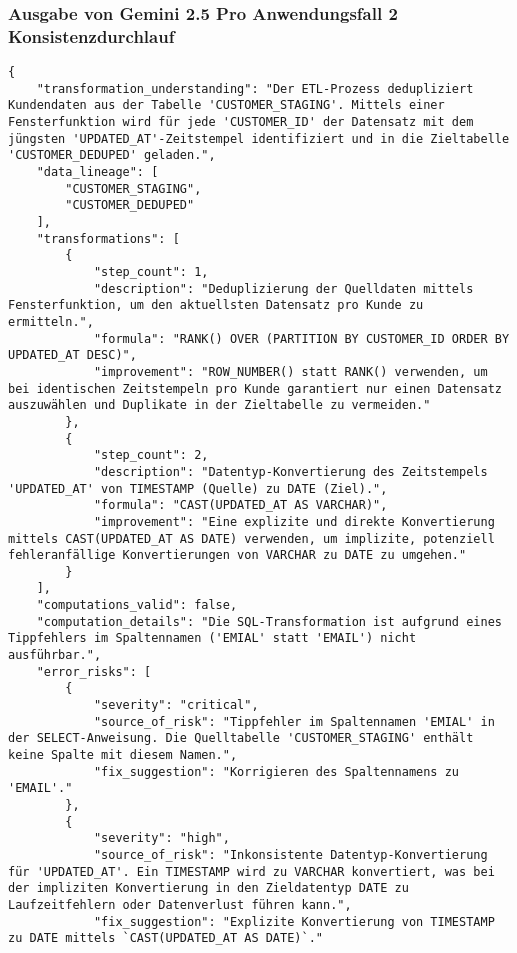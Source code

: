 \subsubsection{Ausgabe von Gemini 2.5 Pro Anwendungsfall 2 Konsistenzdurchlauf}\label{anhang:subsubsec:gemini_case2_prompt2}
\begin{lstlisting}[caption={Ausgabe: Gemini 2.5 Pro Anwendungsfall 2 Konsistenzdurchlauf},label={gemini_case2_prompt2}]
{
    "transformation_understanding": "Der ETL-Prozess dedupliziert Kundendaten aus der Tabelle 'CUSTOMER_STAGING'. Mittels einer Fensterfunktion wird für jede 'CUSTOMER_ID' der Datensatz mit dem jüngsten 'UPDATED_AT'-Zeitstempel identifiziert und in die Zieltabelle 'CUSTOMER_DEDUPED' geladen.",
    "data_lineage": [
        "CUSTOMER_STAGING",
        "CUSTOMER_DEDUPED"
    ],
    "transformations": [
        {
            "step_count": 1,
            "description": "Deduplizierung der Quelldaten mittels Fensterfunktion, um den aktuellsten Datensatz pro Kunde zu ermitteln.",
            "formula": "RANK() OVER (PARTITION BY CUSTOMER_ID ORDER BY UPDATED_AT DESC)",
            "improvement": "ROW_NUMBER() statt RANK() verwenden, um bei identischen Zeitstempeln pro Kunde garantiert nur einen Datensatz auszuwählen und Duplikate in der Zieltabelle zu vermeiden."
        },
        {
            "step_count": 2,
            "description": "Datentyp-Konvertierung des Zeitstempels 'UPDATED_AT' von TIMESTAMP (Quelle) zu DATE (Ziel).",
            "formula": "CAST(UPDATED_AT AS VARCHAR)",
            "improvement": "Eine explizite und direkte Konvertierung mittels CAST(UPDATED_AT AS DATE) verwenden, um implizite, potenziell fehleranfällige Konvertierungen von VARCHAR zu DATE zu umgehen."
        }
    ],
    "computations_valid": false,
    "computation_details": "Die SQL-Transformation ist aufgrund eines Tippfehlers im Spaltennamen ('EMIAL' statt 'EMAIL') nicht ausführbar.",
    "error_risks": [
        {
            "severity": "critical",
            "source_of_risk": "Tippfehler im Spaltennamen 'EMIAL' in der SELECT-Anweisung. Die Quelltabelle 'CUSTOMER_STAGING' enthält keine Spalte mit diesem Namen.",
            "fix_suggestion": "Korrigieren des Spaltennamens zu 'EMAIL'."
        },
        {
            "severity": "high",
            "source_of_risk": "Inkonsistente Datentyp-Konvertierung für 'UPDATED_AT'. Ein TIMESTAMP wird zu VARCHAR konvertiert, was bei der impliziten Konvertierung in den Zieldatentyp DATE zu Laufzeitfehlern oder Datenverlust führen kann.",
            "fix_suggestion": "Explizite Konvertierung von TIMESTAMP zu DATE mittels `CAST(UPDATED_AT AS DATE)`."

\end{lstlisting}
